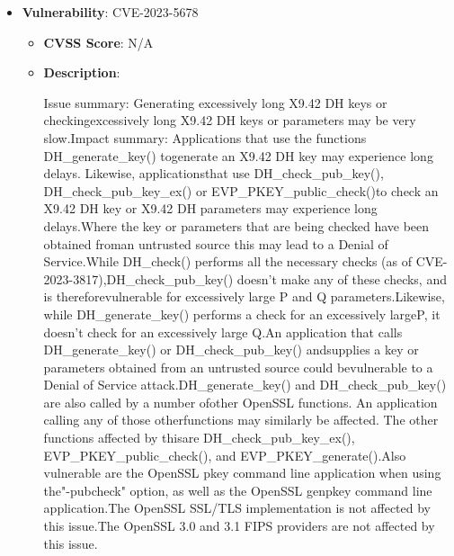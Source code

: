 \documentclass{article}
\begin{document}
\begin{itemize}
        \item \textbf{Vulnerability}: CVE-2023-5678
        \begin{itemize}
            \item \textbf{CVSS Score}:  N/A 
            \item \textbf{Description}:
            \parbox[t]{0.9\linewidth}{
                \ttfamily Issue summary: Generating excessively long X9.42 DH keys or checkingexcessively long X9.42 DH keys or parameters may be very slow.Impact summary: Applications that use the functions DH\_generate\_key() togenerate an X9.42 DH key may experience long delays.  Likewise, applicationsthat use DH\_check\_pub\_key(), DH\_check\_pub\_key\_ex() or EVP\_PKEY\_public\_check()to check an X9.42 DH key or X9.42 DH parameters may experience long delays.Where the key or parameters that are being checked have been obtained froman untrusted source this may lead to a Denial of Service.While DH\_check() performs all the necessary checks (as of CVE-2023-3817),DH\_check\_pub\_key() doesn't make any of these checks, and is thereforevulnerable for excessively large P and Q parameters.Likewise, while DH\_generate\_key() performs a check for an excessively largeP, it doesn't check for an excessively large Q.An application that calls DH\_generate\_key() or DH\_check\_pub\_key() andsupplies a key or parameters obtained from an untrusted source could bevulnerable to a Denial of Service attack.DH\_generate\_key() and DH\_check\_pub\_key() are also called by a number ofother OpenSSL functions.  An application calling any of those otherfunctions may similarly be affected.  The other functions affected by thisare DH\_check\_pub\_key\_ex(), EVP\_PKEY\_public\_check(), and EVP\_PKEY\_generate().Also vulnerable are the OpenSSL pkey command line application when using the"-pubcheck" option, as well as the OpenSSL genpkey command line application.The OpenSSL SSL/TLS implementation is not affected by this issue.The OpenSSL 3.0 and 3.1 FIPS providers are not affected by this issue.
            }
        \end{itemize}
    

\end{itemize}
\end{document}
